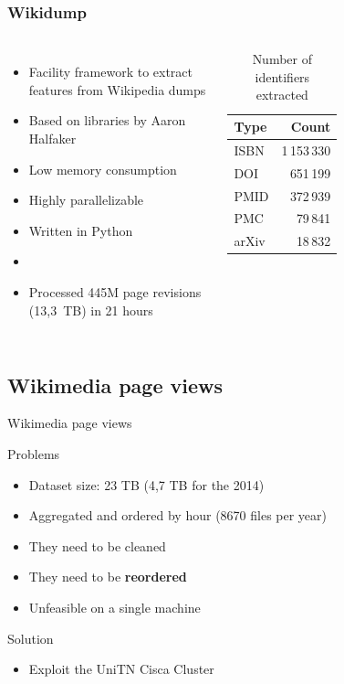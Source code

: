 \documentclass{beamer}
\begin{document}
\begin{frame}
    \frametitle{Wikidump}
    \begin{columns}[t]
        \begin{itemize}
            \item Facility framework to extract features from Wikipedia dumps
            \item Based on libraries by Aaron Halfaker
            \item Low memory consumption
            \item Highly parallelizable
            \item Written in Python
            \item[]
            \item Processed 445M page revisions (13,3~TB) in 21 hours
        \end{itemize}
        \begin{table}
        \begin{tabular}{l r}
        \toprule
        \textbf{Type} & \textbf{Count} \\
        \midrule
        ISBN & 1\,153\,330 \\
        DOI & 651\,199 \\
        PMID & 372\,939 \\
        PMC & 79\,841 \\
        arXiv & 18\,832 \\
        \bottomrule
        \end{tabular}
        \caption{Number of identifiers extracted}
        \end{table}
    \end{columns}
\end{frame}

\subsection{Wikimedia page views}
\begin{frame}{Wikimedia page views}
    \begin{block}{Problems}
        \begin{itemize}
            \item Dataset size: 23 TB (4,7 TB for the 2014)
            \item Aggregated and ordered by hour (8670 files per year)
            \item They need to be cleaned
            \item They need to be \textbf{reordered}
            \item Unfeasible on a single machine
        \end{itemize}
    \end{block}
    \begin{block}{Solution}
        \begin{itemize}
            \item Exploit the UniTN Cisca Cluster
        \end{itemize}
    \end{block}
\end{frame}
\end{document}
